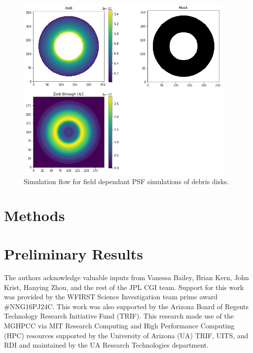 \documentclass[]{spie}  %
\begin{document}
    \begin{figure}[htbp]
    \includegraphics[width=0.95\textwidth]{Unknown-4.png}
    \caption{Simulation flow for field dependant PSF simulations of debris disks.}
    \label{fig:my_label}
\end{figure}
\section{Methods}



\section{Preliminary Results}

    
\acknowledgments %
The authors acknowledge valuable inputs from  Vanessa Bailey,  Brian Kern, John Krist, Hanying Zhou,   and the rest of the JPL CGI team.
 Support for this work was provided by the WFIRST Science Investigation team prime award \#NNG16PJ24C.
This work was also supported by the Arizona Board of Regents Technology Research
Initiative Fund (TRIF).
This research made use of the \gls{MGHPCC} via MIT Research Computing and High Performance Computing (HPC) resources supported by the University of Arizona (UA) TRIF, UITS, and RDI and maintained by the UA Research Technologies department.

\end{document}
